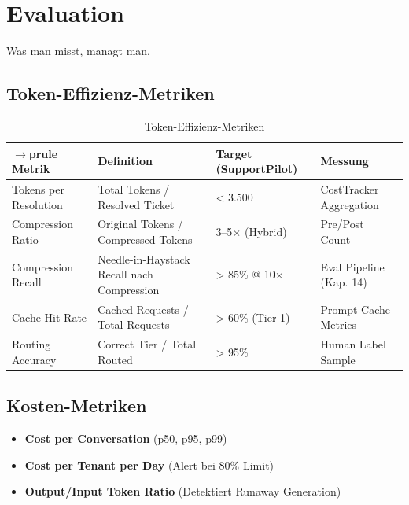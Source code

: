 
\section{Evaluation}
\label{sec:evaluation}

Was man misst, managt man.

\subsection{Token-Effizienz-Metriken}
\label{sec:token_efficiency_metrics}

\begin{table}[H]
\centering
\begin{tabularx}{\linewidth}{lXXX}
$\to$prule
\textbf{Metrik} & \textbf{Definition} & \textbf{Target (SupportPilot)} & \textbf{Messung} \\
\midrule
Tokens per Resolution & Total Tokens / Resolved Ticket & < 3.500 & CostTracker Aggregation \\
Compression Ratio & Original Tokens / Compressed Tokens & 3--5$\times$ (Hybrid) & Pre/Post Count \\
Compression Recall & Needle-in-Haystack Recall nach Compression & > 85\% @ 10$\times$ & Eval Pipeline (Kap. 14) \\
Cache Hit Rate & Cached Requests / Total Requests & > 60\% (Tier 1) & Prompt Cache Metrics \\
Routing Accuracy & Correct Tier / Total Routed & > 95\% & Human Label Sample \\
\bottomrule
\end{tabularx}
\caption{Token-Effizienz-Metriken}
\label{tab:token_metrics}
\end{table}

\subsection{Kosten-Metriken}
\label{sec:cost_metrics}

\begin{itemize}[leftmargin=*]
  \item \textbf{Cost per Conversation} (p50, p95, p99)
  \item \textbf{Cost per Tenant per Day} (Alert bei 80\% Limit)
  \item \textbf{Output/Input Token Ratio} (Detektiert Runaway Generation)
\end{itemize}

